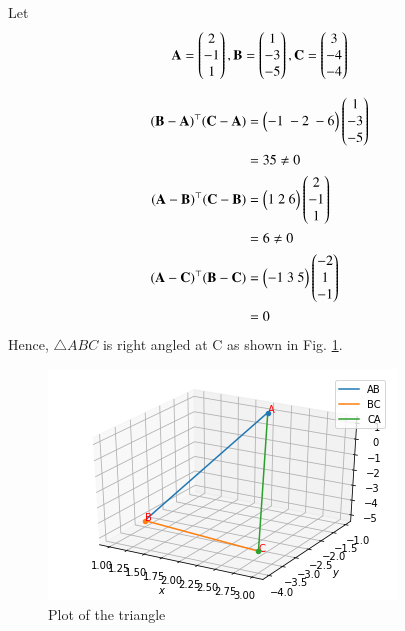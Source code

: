 
Let
\begin{align}
   \mathbf{A} = \begin{pmatrix}2\\-1\\1\end{pmatrix} , \mathbf{B} = \begin{pmatrix}1\\-3\\-5\end{pmatrix}, \mathbf{C} = \begin{pmatrix}3\\-4\\-4\end{pmatrix} 
\end{align}

\begin{align}
     (\vec{B}-\vec{A})^\top(\vec{C}-\vec{A})&=\myvec{-1\ -2\ -6}\myvec{1\\-3\\-5}
     \\
& = 35 \ne 0
\\
     (\vec{A}-\vec{B})^\top(\vec{C}-\vec{B})&=\myvec{1\ 2\ 6}\myvec{2\\-1\\1}
\\
&= 6 \ne 0
\\
(\vec{A}-\vec{C})^\top(\vec{B}-\vec{C})&=\myvec{-1\ 3\ 5}\myvec{-2\\1\\-1}
\\
&= 0
\end{align}
Hence, $\triangle ABC$ is right angled at C as shown in Fig. \ref{aug/2/3plot}.
%
\begin{figure}[!h]
         \centering
         \includegraphics[width=\columnwidth]{solutions/aug/2/3/figures/right-angled.png}
         \caption{Plot of the triangle}
         \label{aug/2/3plot}
\end{figure}

